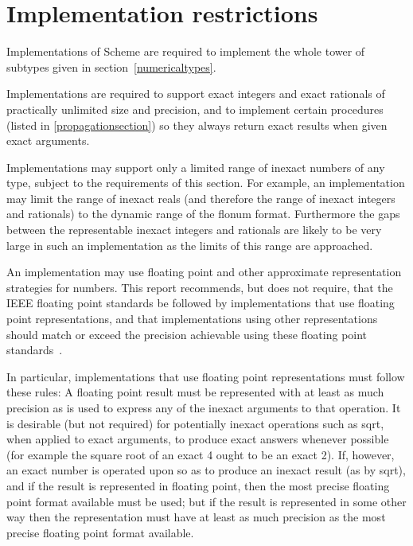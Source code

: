 \section{Implementation restrictions}

\label{restrictions}

\vest Implementations of Scheme are required to implement the whole
tower of subtypes given in section~\ref{numericaltypes}.

\vest Implementations are required to support
exact integers and exact rationals of
practically unlimited size and precision, and to implement
certain procedures (listed in \ref{propagationsection})
so they always return exact results when given exact
arguments.

\vest Implementations may support only a limited range of
inexact numbers of
any type, subject to the requirements of this section.  For example,
an implementation may
limit the range of inexact reals (and therefore
the range of inexact integers and rationals)
to the dynamic range of the flonum format.
Furthermore
the gaps between the representable inexact integers and
rationals are
likely to be very large in such an implementation as the limits of this
range are approached.

\vest An implementation may use floating point and other approximate 
representation strategies for  numbers.
This report recommends, but does not require, that the IEEE 
floating point standards be followed by implementations that use
floating point representations, and that implementations using
other representations should match or exceed the precision achievable
using these floating point standards~\cite{IEEE}.

\vest In particular, implementations that use floating point
representations must follow these rules: A floating point result
must be represented with at least as much precision as is
used to express any of the inexact arguments to that operation.
It is desirable (but not required) for
potentially inexact operations such as {\cf sqrt}, when applied to exact
arguments, to produce exact answers whenever possible (for example the
square root of an exact 4 ought to be an exact 2).
If, however, an
exact number is operated upon so as to produce an inexact result
(as by {\cf sqrt}), and if the result is represented in floating
point, then the most precise floating point format available
must be used; but if the result
is represented in some other way then the representation must have
at least as much precision as the most precise
floating point format available.

